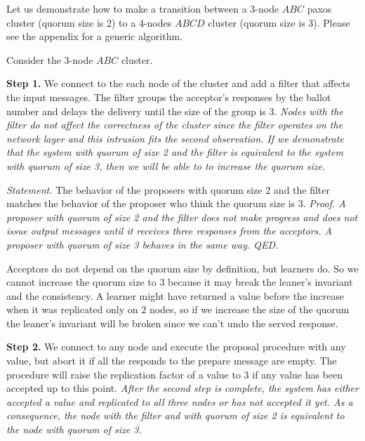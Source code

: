 \documentclass[12pt]{article}
\begin{document}
Let us demonstrate how to make a transition between a 3-node $ABC$ paxos cluster (quorum size is 2) to a 4-nodes $ABCD$ cluster (quorum size is 3). Please see the appendix for a generic algorithm.

Consider the 3-node $ABC$ cluster.

\bigskip

{\bf Step 1.} We connect to the each node of the cluster and add a filter that affects the input messages. The filter groups the acceptor's responses by the ballot number and delays the delivery until the size of the group is $3$. \textit{Nodes with the filter do not affect the correctness of the cluster since the filter operates on the network layer and this intrusion fits the second observation. If we demonstrate that the system with quorum of size 2 and the filter is equivalent to the system with quorum of size 3, then we will be able to to increase the quorum size.}

\smallskip

\emph{Statement.} The behavior of the proposers with quorum size $2$ and the filter matches the behavior of the proposer who think the quorum size is $3$. \textit{Proof. A proposer with quorum of size 2 and the filter does not make progress and does not issue output messages until it receives three responses from the acceptors. A proposer with quorum of size 3 behaves in the same way. QED.}

\smallskip

Acceptors do not depend on the quorum size by definition, but learners do. So we cannot increase the quorum size to $3$ because it may break the leaner's invariant and the consistency. A learner might have returned a value before the increase when it was replicated only on $2$ nodes, so if we increase the size of the quorum the leaner's invariant will be broken since we can't undo the served response.

\smallskip

{\bf Step 2.} We connect to any node and execute the proposal procedure with any value, but abort it if all the responds to the prepare message are empty. The procedure will raise the replication factor of a value to $3$ if any value has been accepted up to this point. \textit{After the second step is complete, the system has either accepted a value and replicated to all three nodes or has not accepted it yet. As a consequence, the node with the filter and with quorum of size 2 is equivalent to the node with quorum of size 3.}

\smallskip
\end{document}
